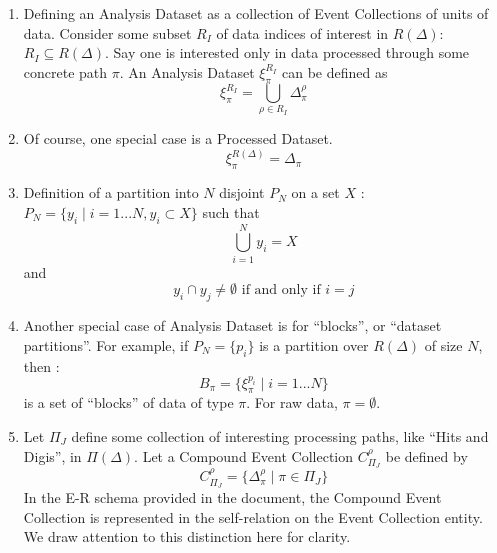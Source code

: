 \documentclass{cmspaper}
\begin{document}
{\begin{enumerate}

\item Defining an Analysis Dataset as a collection of Event Collections of 
      units of data. Consider some subset $R_I$ of data indices of interest 
      in $R(\Delta)$:  $R_I \subseteq R(\Delta)$. Say one is interested only 
      in data processed through some concrete path $\pi$.  An Analysis 
      Dataset $\xi_{\pi}^{R_I}$ can be defined as 
\begin{equation}
\xi_{\pi}^{R_I} = \bigcup_{\rho \in R_I} \Delta_{\pi}^{\rho}
\end{equation}

\item Of course, one special case is a Processed Dataset. 
\begin{equation} 
\xi_{\pi}^{R(\Delta)} = \Delta_{\pi}
\end{equation}


\item Definition of a partition into $N$ disjoint $P_N$ on a set $X$ : 
$ P_N = \{ y_i \mid i = 1...N, y_i \subset X \} $ such that 
\begin{equation}
\bigcup_{i=1}^N y_i = X
\end{equation} 
and 
\begin{equation} 
y_i \cap y_j \neq \emptyset \mbox{ if and only if } i = j
\end{equation}
 
\item  Another special case of Analysis Dataset is for ``blocks'', or 
       ``dataset partitions''.  For example, if
$P_N = \{ p_i \}$ is a partition over $R(\Delta)$ of size $N$, then : 
\begin{equation}
B_{\pi} = \{ \xi_{\pi}^{p_i} \mid i = 1...N\}
\end{equation}
is a set of ``blocks'' of data of type $\pi$.  For raw data, $\pi = \emptyset$.


\item Let $\Pi_J$ define some collection of interesting processing paths, 
      like ``Hits and Digis'', in $\Pi(\Delta)$.  Let a Compound Event 
      Collection $C_{\Pi_J}^{\rho}$ be defined by
\begin{equation}
C_{\Pi_J}^{\rho} = \{ \Delta_{\pi}^{\rho} \mid \pi \in \Pi_J \}
\end{equation}
In the E-R schema provided in the document, the Compound Event Collection
is represented in the self-relation on the Event Collection entity.
We draw attention to this distinction here for clarity.


\end{enumerate}}
\end{document}
